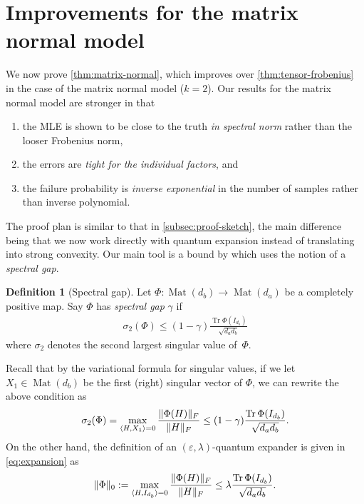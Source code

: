 \documentclass[aos]{imsart}
\theoremstyle{definition}
\newtheorem*{definition}{Definition}
\numberwithin{equation}{section}
\DeclareMathOperator{\Mat}{Mat}
\DeclareMathOperator{\tr}{Tr}
\DeclarePairedDelimiter{\norm}{\lVert}{\rVert}
\newcommand{\eps}{\varepsilon}
\begin{document}
\section{Improvements for the matrix normal model}\label{sec:matrix-normal}
We now prove \cref{thm:matrix-normal}, which improves over \cref{thm:tensor-frobenius} in the case of the matrix normal model ($k=2$).
Our results for the matrix normal model are stronger in that
\begin{enumerate}
\item the MLE is shown to be close to the truth \emph{in spectral norm} rather than the looser Frobenius norm,
\item the errors are \emph{tight for the individual factors}, and
\item the failure probability is \emph{inverse exponential} in the number of samples rather than inverse polynomial.
\end{enumerate}

The proof plan is similar to that in \cref{subsec:proof-sketch}, the main difference being that we now work directly with quantum expansion instead of translating into strong convexity.
Our main tool is a bound by \cite{KLR19} which uses the notion of a \emph{spectral gap}.

\begin{definition}[Spectral gap]
Let $\Phi\colon\Mat(d_b) \to \Mat(d_a)$ be a completely positive map.
Say $\Phi$ has \emph{spectral gap} $\gamma$ if
\begin{align}\label{eq:spectral-gap}
  \sigma_2(\Phi) \leq (1 - \gamma) \frac{\tr \Phi(I_{d_b})}{\sqrt{d_a d_b}}
\end{align}
where $\sigma_2$ denotes the second largest singular value of~$\Phi$.
\end{definition}

Recall that by the variational formula for singular values, if we let $X_{1} \in \Mat(d_{b})$ be the first (right) singular vector of $\Phi$, we can rewrite the above condition as
\begin{align*}
  \sigma_2(\Phi) = \max_{\langle H, X_{1} \rangle = 0} \frac{\norm{\Phi(H)}_{F}}{\norm{H}_{F}} \leq (1 - \gamma) \frac{\tr \Phi(I_{d_b})}{\sqrt{d_a d_b}} .
\end{align*}
On the other hand, the definition of an $(\eps,\lambda)$-quantum expander is given in \cref{eq:expansion} as
\begin{align*}
      \norm{\Phi}_0 := \max_{\langle H, I_{d_{b}} \rangle = 0} \frac{\norm{\Phi(H)}_F}{\norm{H}_{F}}
\leq \lambda \frac{\tr \Phi(I_{d_b})}{\sqrt{d_a d_b}}  .
\end{align*}
\end{document}
